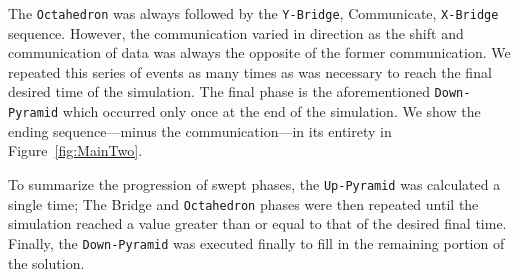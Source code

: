 \documentclass[review]{elsarticle}
\def\Up{\texttt{Up-Pyramid}}
\def\Down{\texttt{Down-Pyramid}}
\def\Oct{\texttt{Octahedron}}
\def\Xb{\texttt{X-Bridge}}
\def\Yb{\texttt{Y-Bridge}}
\begin{document}
\par
The \Oct{} was always followed by the \Yb{}, Communicate, \Xb{} sequence. However, the communication varied in direction as the shift and communication of data was always the opposite of the former communication. We repeated this series of events as many times as was necessary to reach the final desired time of the simulation. The final phase is the aforementioned \Down{} which occurred only once at the end of the simulation. We show the ending sequence---minus the communication---in its entirety in Figure~\ref{fig:MainTwo}. 
\par
To summarize the progression of swept phases, the \Up{} was calculated a single time; The Bridge and \Oct{} phases were then repeated until the simulation reached a value greater than or equal to that of the desired final time. Finally, the \Down{} was executed finally to fill in the remaining portion of the solution.
\end{document}
